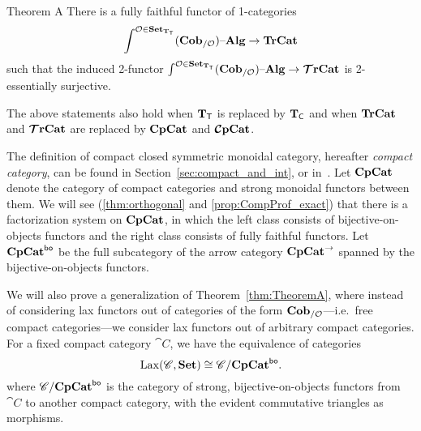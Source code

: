 \documentclass[12pt,oneside,article,draft]{memoir}
\begin{document}
\begin{named}{Theorem A}\label{thm:TheoremA}
  There is a fully faithful functor of 1-categories
  \begin{equation*}
     \int^{\mathcal{O}\in\mathbf{Set}_{\mathbf{T}_{\mathsf{T}}}}(\mathbf{Cob}_{/\mathcal{O}}){\text \textendash}\mathbf{Alg} \to \mathbf{TrCat}
  \end{equation*}
  such that the induced 2-functor $\int^{\mathcal{O}\in\mathbf{Set}_{\mathbf{T}_{\mathsf{T}}}}(\mathbf{Cob}_{/\mathcal{O}}){\text \textendash}\mathbf{Alg}\to\bm{\mathcal{T}}\mathbf{rCat}$ is 2-essentially surjective. 

  The above statements also hold when $\mathbf{T}_{\mathsf{T}}$ is replaced by $\mathbf{T}_{\mathsf{C}}$ and when $\mathbf{TrCat}$ and $\bm{\mathcal{T}}\mathbf{rCat}$ are replaced by $\mathbf{CpCat}$ and $\bm{\mathcal{C}}\mathbf{pCat}$.
\end{named}



The definition of compact closed symmetric monoidal category, hereafter \emph{compact category}, can
be found in Section~\ref{sec:compact_and_int}, or in~\cite{MacLane}. Let $\mathbf{CpCat}$ denote the
category of compact categories and strong monoidal functors between them. We will see
(\ref{thm:orthogonal} and \ref{prop:CompProf_exact}) that there is a factorization system on
$\mathbf{CpCat}$, in which the left class consists of bijective-on-objects functors and the right class
consists of fully faithful functors. Let $\mathbf{CpCat}^{\mathsf{bo}}$ be the full subcategory of the arrow
category $\mathbf{CpCat}^{\to}$ spanned by the bijective-on-objects functors.

We will also prove a generalization of Theorem~\ref{thm:TheoremA}, where instead of considering lax
functors out of categories of the form $\mathbf{Cob}_{/\mathcal{O}}$---i.e.\ free compact categories---we
consider lax functors out of arbitrary compact categories. For a fixed compact category $\cat{C}$,
we have the equivalence of categories
\begin{equation}\label{eqn:lax_compcat_bo}
   \operatorname{Lax}(\mathscr{C},\mathbf{Set})\cong\mathscr{C}/\mathbf{CpCat}^{\mathsf{bo}}.
\end{equation}
where $\mathscr{C}/\mathbf{CpCat}^{\mathsf{bo}}$ is the category of strong, bijective-on-objects functors from
$\cat{C}$ to another compact category, with the evident commutative triangles as morphisms.
\end{document}
